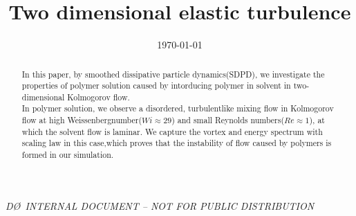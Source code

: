 \documentclass[aps,prl,twocolumn,showpacs,superscriptaddress,groupedaddress]{revtex4}  %
\begin{document}
\widetext
{}
\centerline{\em D\O\ INTERNAL DOCUMENT -- NOT FOR PUBLIC DISTRIBUTION}


\title{Two dimensional elastic turbulence}
\date{\today}


\begin{abstract}
In this paper, by smoothed dissipative particle dynamics(SDPD), we investigate the properties of polymer solution caused by intorducing polymer in solvent 
in two-dimensional Kolmogorov flow.\\
In polymer solution, we observe a disordered, turbulentlike mixing flow in
Kolmogorov flow at high Weissenbergnumber($Wi\approx29$) and small Reynolds numbers($Re\approx1$), at which the solvent flow is laminar.
We capture the vortex and energy spectrum with scaling law in this case,which proves that the instability of flow caused by polymers is formed in our simulation.
\end{abstract}

\pacs{}
\maketitle
\end{document}
